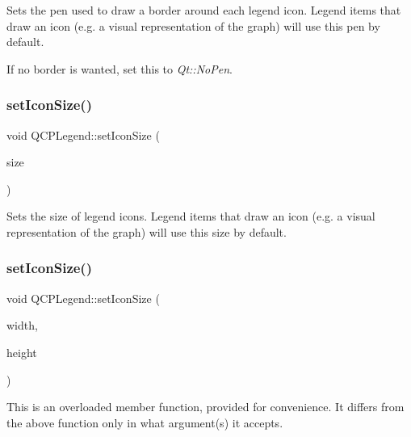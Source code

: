 Sets the pen used to draw a border around each legend icon. Legend items that draw an icon (e.\+g. a visual representation of the graph) will use this pen by default.

If no border is wanted, set this to {\itshape Qt\+::\+No\+Pen}. \hypertarget{class_q_c_p_legend_a8b0740cce488bf7010da6beda6898984}{}\label{class_q_c_p_legend_a8b0740cce488bf7010da6beda6898984} 
\subsubsection{\texorpdfstring{set\+Icon\+Size()}{setIconSize()}\hspace{0.1cm}{\footnotesize\ttfamily [1/2]}}
{\footnotesize\ttfamily void Q\+C\+P\+Legend\+::set\+Icon\+Size (\begin{DoxyParamCaption}\item[{const Q\+Size \&}]{size }\end{DoxyParamCaption})}

Sets the size of legend icons. Legend items that draw an icon (e.\+g. a visual representation of the graph) will use this size by default. \hypertarget{class_q_c_p_legend_a96b1a37fd4ee6a9778e6e54fe56ab6c2}{}\label{class_q_c_p_legend_a96b1a37fd4ee6a9778e6e54fe56ab6c2} 
\subsubsection{\texorpdfstring{set\+Icon\+Size()}{setIconSize()}\hspace{0.1cm}{\footnotesize\ttfamily [2/2]}}
{\footnotesize\ttfamily void Q\+C\+P\+Legend\+::set\+Icon\+Size (\begin{DoxyParamCaption}\item[{int}]{width,  }\item[{int}]{height }\end{DoxyParamCaption})}

This is an overloaded member function, provided for convenience. It differs from the above function only in what argument(s) it accepts. \hypertarget{class_q_c_p_legend_a62973bd69d5155e8ea3141366e8968f6}{}\label{class_q_c_p_legend_a62973bd69d5155e8ea3141366e8968f6} 
